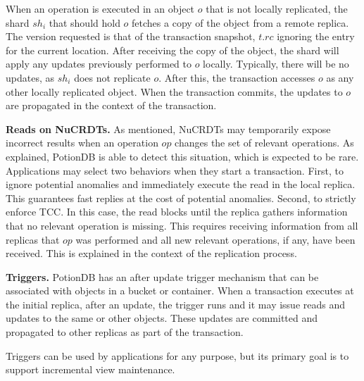 \documentclass[sigplan,twocolumn,review,anonymous]{acmart}
\newcommand{\andre}[1]{\nbnote{Andre}{blue}{#1}}
\begin{document}
When an operation is executed in an object $o$ that is not locally replicated, 
the shard $sh_i$ that should hold $o$ fetches 
a copy of the object from a remote replica. The version
requested is that
of the transaction snapshot,  $t\!.\mathit{rc}$ ignoring the entry for the current location.
After receiving the copy of the object, the shard will apply any updates previously performed to $o$ locally. Typically,
there will be no updates, as $sh_i$ does not replicate $o$.
After this, the transaction accesses $o$ as any other locally replicated object. When the transaction commits, 
the updates to $o$ are propagated in the context of the transaction.

\noindent
\textbf{Reads on NuCRDTs.}
As mentioned, NuCRDTs may temporarily expose 
incorrect results when an operation $op$ changes the set of relevant operations.  
As explained, PotionDB is able to detect this situation, which is expected to be rare. 
Applications may select two behaviors when they start a transaction.
First, to ignore potential anomalies and immediately execute the read in the local replica.
This guarantees fast replies at the cost of potential anomalies. 
%
Second, to strictly enforce TCC. In this case, the read blocks until the replica gathers 
information that no relevant operation is missing. This requires receiving information from
all replicas that $op$ was performed and all new relevant operations, if any, have been
received. This is explained in the context of the replication process.

\noindent
\textbf{Triggers.}
PotionDB has an after update trigger mechanism that can be associated with 
objects in a bucket or container.
When a transaction executes at the initial replica, after an update, the
trigger runs and it may issue reads and updates to the same or other objects.
These updates are committed and propagated to other replicas
as part of the transaction.

Triggers can be used by applications for any purpose, 
but its primary goal is to support incremental view maintenance.%
\end{document}
